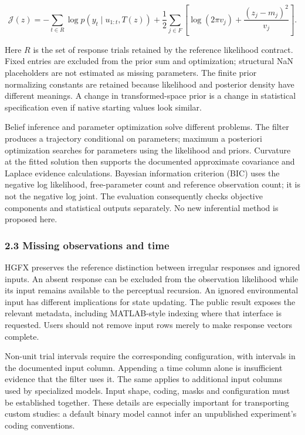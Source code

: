 \documentclass[
  11pt,
]{article}
\begin{document}
\[
\mathcal J(z)=-\sum_{t\in R}\log p(y_t\mid u_{1:t},T(z))
+\frac12\sum_{j\in F}\left[\log(2\pi v_j)+\frac{(z_j-m_j)^2}{v_j}\right].
\]

Here \(R\) is the set of response trials retained by the reference
likelihood contract. Fixed entries are excluded from the prior sum and
optimization; structural NaN placeholders are not estimated as missing
parameters. The finite prior normalizing constants are retained because
likelihood and posterior density have different meanings. A change in
transformed-space prior is a change in statistical specification even if
native starting values look similar.

Belief inference and parameter optimization solve different problems.
The filter produces a trajectory conditional on parameters; maximum a
posteriori optimization searches for parameters using the likelihood and
priors. Curvature at the fitted solution then supports the documented
approximate covariance and Laplace evidence calculations. Bayesian
information criterion (BIC) uses the negative log likelihood,
free-parameter count and reference observation count; it is not the
negative log joint. The evaluation consequently checks objective
components and statistical outputs separately. No new inferential method
is proposed here.

\subsubsection{2.3 Missing observations and
time}\label{missing-observations-and-time}

HGFX preserves the reference distinction between irregular responses and
ignored inputs. An absent response can be excluded from the observation
likelihood while its input remains available to the perceptual
recursion. An ignored environmental input has different implications for
state updating. The public result exposes the relevant metadata,
including MATLAB-style indexing where that interface is requested. Users
should not remove input rows merely to make response vectors complete.

Non-unit trial intervals require the corresponding configuration, with
intervals in the documented input column. Appending a time column alone
is insufficient evidence that the filter uses it. The same applies to
additional input columns used by specialized models. Input shape,
coding, masks and configuration must be established together. These
details are especially important for transporting custom studies: a
default binary model cannot infer an unpublished experiment's coding
conventions.
\end{document}
